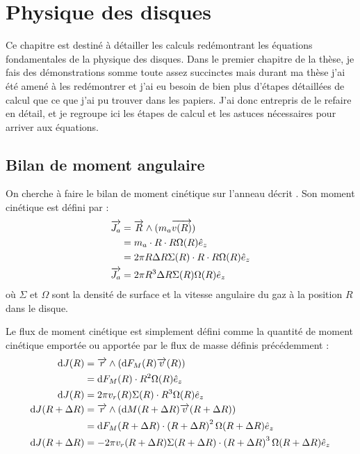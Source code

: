 \chapter{Physique des disques}
Ce chapitre est destiné à détailler les calculs redémontrant les équations fondamentales de la physique des disques. Dans le premier chapitre de la thèse, je fais des démonstrations somme toute assez succinctes mais durant ma thèse j'ai été amené à les redémontrer et j'ai eu besoin de bien plus d'étapes détaillées de calcul que ce que j'ai pu trouver dans les papiers. J'ai donc entrepris de le refaire en détail, et je regroupe ici les étapes de calcul et les astuces nécessaires pour arriver aux équations.

\section{Bilan de moment angulaire}\label{app:equation_angular_momentum}
On cherche à faire le bilan de moment cinétique sur l'anneau décrit . Son moment cinétique est défini par :
\begin{align}
\vect{J_a} &= \vect{R} \wedge (m_a\vect{v(R)}) \nonumber\\
&= m_a \cdot R \cdot R\Omega(R)\hat{e}_z\nonumber\\
&= 2\pi R \Delta R \Sigma(R)\cdot R \cdot R\Omega(R)\hat{e}_z\nonumber\\
\vect{J_a} &= 2\pi R^3 \Delta R \Sigma(R)\Omega(R)\hat{e}_z\label{eq:J_a2}
\end{align}
où $\Sigma$ et $\Omega$ sont la densité de surface et la vitesse angulaire du gaz à la position $R$ dans le disque.

Le flux de moment cinétique est simplement défini comme la quantité de moment cinétique emportée ou apportée par le flux de masse définis précédemment  :
\begin{subequations}
\begin{align}
\dif J(R) &= \vect{r} \wedge \left(\dif F_M(R) \vect{v}(R)\right)\nonumber\\
 &= \dif F_M(R) \cdot R^2\Omega(R)\hat{e}_z\nonumber\\
\dif J(R) &= 2\pi v_r(R) \Sigma(R)\cdot R^3\Omega(R)\hat{e}_z\label{eq:dJ_in2}\\
\dif J(R+\Delta R) &= \vect{r} \wedge \left(\dif M(R+\Delta R) \vect{v}(R+\Delta R)\right)\nonumber\\
 &= \dif F_M(R+\Delta R) \cdot \left(R+\Delta R\right)^2\Omega(R+\Delta R)\hat{e}_z\nonumber\\
\dif J(R+\Delta R) &= -2\pi v_r(R+\Delta R) \Sigma(R+\Delta R)\cdot \left(R+\Delta R\right)^3\Omega(R+\Delta R)\hat{e}_z\label{eq:dJ_out2}
\end{align}\label{eq:dJ2}
\end{subequations}

